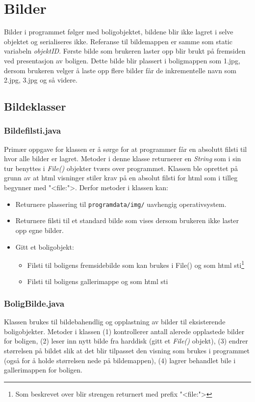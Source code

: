 \section{Bilder}
Bilder i programmet følger med boligobjektet, bildene blir ikke lagret i selve objektet og serialiseres ikke. Referanse til bildemappen er samme som static variabeln \emph{objektID}. Første bilde som brukeren laster opp blir brukt på fremsiden ved presentasjon av boligen. Dette bilde blir plassert i boligmappen som 1.jpg, dersom brukeren velger å laste opp flere bilder får de inkrementelle navn som 2.jpg, 3.jpg og så videre. 

\subsection{Bildeklasser}
\subsubsection*{Bildefilsti.java}
Primær oppgave for klassen er å sørge for at programmer får en absolutt filsti til hvor alle bilder er lagret. Metoder i denne klasse returnerer en \emph{String} som i sin tur benyttes i \emph{File()} objekter tværs over programmet.  
Klassen ble oprettet på grunn av at html visninger stiler krav på en absolut filsti for html som i tilleg begynner med "<file:">. Derfor metoder i klassen kan: 
\begin{itemize}[noitemsep,nolistsep]
\item Returnere plassering til \texttt{programdata/img/} uavhengig operativsystem.
\item Returnere filsti til et standard bilde som vises dersom brukeren ikke laster opp egne bilder.
\item Gitt et boligobjekt:
\begin{itemize}
\item Filsti til boligens fremsidebilde som kan brukes i File() og som html sti\footnote{Som beskrevet over blir strengen returnert med prefix "<file:">}
\item Filsti til boligens gallerimappe og som html sti
\end{itemize}
\end{itemize}

\subsubsection*{BoligBilde.java}
Klassen brukes til bildebahendlig og opplastning av bilder til eksisterende boligobjekter. Metoder i klassen (1) kontrollerer antall alerede opplastede bilder for boligen, (2) leser inn nytt bilde fra harddisk (gitt et \emph{File()} objekt), (3) endrer størrelsen på bildet slik at det blir tilpasset den visning som brukes i programmet (også for å holde størrelsen nede på bildemappen), (4) lagrer behandlet bile i gallerimappen for boligen.

